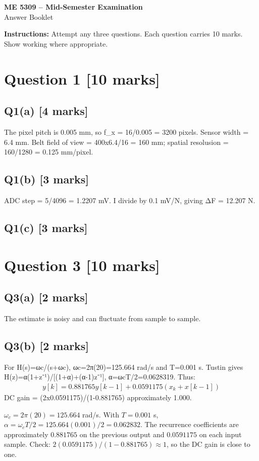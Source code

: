\documentclass[11pt,a4paper]{article}
\begin{document}
\begin{center}
{\Large\bfseries ME 5309 -- Mid-Semester Examination}\\[3pt]
{\large Answer Booklet}\\[8pt]
\end{center}
\textbf{Instructions:} Attempt any three questions. Each question carries 10 marks. Show working where appropriate.
\section*{Question 1 \hfill [10 marks]}
\subsection*{Q1(a) \hfill [4 marks]}

The pixel pitch is 0.005 mm, so f\_x = 16/0.005 = 3200 pixels.
Sensor width = 6.4 mm.
Belt field of view = 400x6.4/16 = 160 mm; spatial resolusion = 160/1280 = 0.125 mm/pixel.

\subsection*{Q1(b) \hfill [3 marks]}

ADC step = 5/4096 = 1.2207 mV.
I divide by 0.1 mV/N, giving ΔF = 12.207 N.

\subsection*{Q1(c) \hfill [3 marks]}

\vspace{2mm}

\section*{Question 3 \hfill [10 marks]}
\subsection*{Q3(a) \hfill [2 marks]}

The estimate is noisy and can fluctuate from sample to sample.

\subsection*{Q3(b) \hfill [2 marks]}

For H(s)=ωc/(s+ωc), ωc=2π(20)=125.664 rad/s and T=0.001 s.
Tustin gives H(z)=α(1+z⁻¹)/[(1+α)+(α-1)z⁻¹], α=ωcT/2=0.0628319.
Thus:\[\begin{aligned}y[k]=0.881765y[k-1]+0.0591175(x_k+x[k-1])\end{aligned}\]
DC gain = (2x0.0591175)/(1-0.881765) approximately 1.000.\par\smallskip $\omega_c=2\pi(20)=125.664$ rad/s. With $T=0.001$ s, $\alpha=\omega_cT/2=125.664(0.001)/2=0.062832$. The recurrence coefficients are approximately $0.881765$ on the previous output and $0.0591175$ on each input sample. Check: $2(0.0591175)/(1-0.881765)\approx1$, so the DC gain is close to one.
\end{document}
